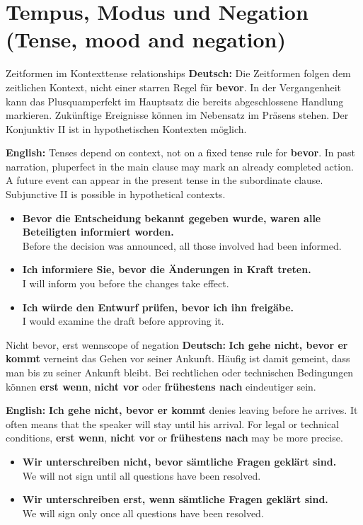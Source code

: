 \documentclass[a4paper,11pt]{article}
\newcommand{\GermanText}[1]{\textbf{Deutsch: }#1\par}
\newcommand{\EnglishText}[1]{{\small\color{SoftGray}\textbf{English: }#1\par}}
\newcommand{\ExampleItem}[2]{\item \textbf{#1}\\{\small\color{SoftGray}#2}}
\begin{document}
    \section{Tempus, Modus und Negation (Tense, mood and negation)}
        \begin{grammarentry}{Zeitformen im Kontext}{tense relationships}
            \GermanText{Die Zeitformen folgen dem zeitlichen Kontext, nicht einer starren Regel für \textbf{bevor}. In der Vergangenheit kann das Plusquamperfekt im Hauptsatz die bereits abgeschlossene Handlung markieren. Zukünftige Ereignisse können im Nebensatz im Präsens stehen. Der Konjunktiv II ist in hypothetischen Kontexten möglich.}
            \EnglishText{Tenses depend on context, not on a fixed tense rule for \textbf{bevor}. In past narration, pluperfect in the main clause may mark an already completed action. A future event can appear in the present tense in the subordinate clause. Subjunctive II is possible in hypothetical contexts.}
        \end{grammarentry}
        \begin{exbox}
            \begin{itemize}
                \ExampleItem{Bevor die Entscheidung bekannt gegeben wurde, waren alle Beteiligten informiert worden.}{Before the decision was announced, all those involved had been informed.}
                \ExampleItem{Ich informiere Sie, bevor die Änderungen in Kraft treten.}{I will inform you before the changes take effect.}
                \ExampleItem{Ich würde den Entwurf prüfen, bevor ich ihn freigäbe.}{I would examine the draft before approving it.}
            \end{itemize}
        \end{exbox}
        \begin{grammarentry}{Nicht bevor, erst wenn}{scope of negation}
            \GermanText{\textbf{Ich gehe nicht, bevor er kommt} verneint das Gehen vor seiner Ankunft. Häufig ist damit gemeint, dass man bis zu seiner Ankunft bleibt. Bei rechtlichen oder technischen Bedingungen können \textbf{erst wenn}, \textbf{nicht vor} oder \textbf{frühestens nach} eindeutiger sein.}
            \EnglishText{\textbf{Ich gehe nicht, bevor er kommt} denies leaving before he arrives. It often means that the speaker will stay until his arrival. For legal or technical conditions, \textbf{erst wenn}, \textbf{nicht vor} or \textbf{frühestens nach} may be more precise.}
        \end{grammarentry}
        \begin{exbox}
            \begin{itemize}
                \ExampleItem{Wir unterschreiben nicht, bevor sämtliche Fragen geklärt sind.}{We will not sign until all questions have been resolved.}
                \ExampleItem{Wir unterschreiben erst, wenn sämtliche Fragen geklärt sind.}{We will sign only once all questions have been resolved.}
            \end{itemize}
        \end{exbox}
\end{document}
